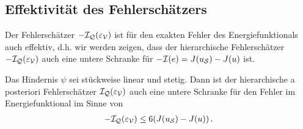 \subsection{Effektivität des Fehlerschätzers}
\label{kap:4.1.5}

Der Fehlerschätzer  $-\mathcal I_{\mathcal Q}(\varepsilon_{\mathcal V})$ ist für den exakten Fehler des Energiefunktionals auch effektiv, d.h. wir werden zeigen, dass der hierarchische Fehlerschätzer $-\mathcal I_{\mathcal Q}(\varepsilon_{\mathcal V})$ auch eine untere Schranke für $-\mathcal I(e) = J(u_{\mathcal S}) - J(u)$ ist.


\begin{theorem}\label{theorem:4.25}
Das Hindernis $\psi$ sei stückweise linear und stetig. Dann ist der hierarchische a posteriori Fehlerschätzer $\mathcal I_{\mathcal Q}(\varepsilon_{\mathcal V})$ auch eine untere Schranke für den Fehler im Energiefunktional im Sinne von
\begin{align}
	-\mathcal I_{\mathcal Q}(\varepsilon_{\mathcal V}) \le 6 (J(u_{\mathcal S})-J(u)) \, .
\end{align}
\end{theorem}


